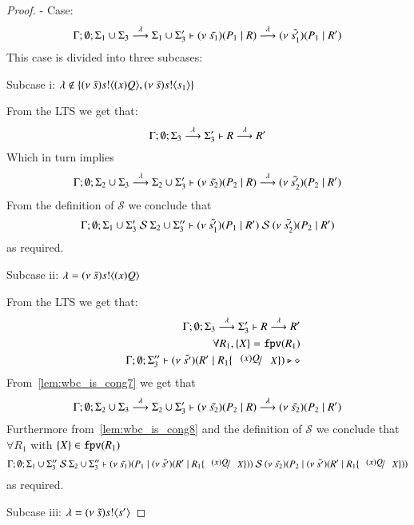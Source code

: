 \begin{proof}
	\noi - Case:
%
	\[
		\Gamma; \emptyset; \Sigma_1 \cup \Sigma_3 \stackrel{\lambda}{\longrightarrow} \Sigma_1 \cup \Sigma_3' \vdash (\nu\ \tilde{s_1})(P_1 \;|\; R) \stackrel{\lambda}{\longrightarrow} (\nu\ \tilde{s_1'})(P_1 \;|\; R')
	\]
%
	\noi This case is divided into three subcases:

	\noi Subcase i: $\lambda \notin \{(\nu\ \tilde{s}) s ! \langle (x)Q \rangle, (\nu\ \tilde{s}) s ! \langle s_1 \rangle\}$

	\noi From the LTS we get that:
	\[
		\Gamma; \emptyset; \Sigma_3 \stackrel{\lambda}{\longrightarrow} \Sigma_3' \vdash R \stackrel{\lambda}{\longrightarrow} R'
	\]
%
	\noi Which in turn implies
	\begin{eqnarray*}
		\Gamma; \emptyset; \Sigma_2 \cup \Sigma_3 \stackrel{\lambda}{\longrightarrow} \Sigma_2 \cup \Sigma_3' \vdash (\nu\ \tilde{s_2})(P_2 \;|\; R) \stackrel{\lambda}{\longrightarrow} (\nu\ \tilde{s_2'})(P_2 \;|\; R')
	\end{eqnarray*}
%
	\noi From the definition of $\mathcal{S}$ we conclude that
	\[
		\Gamma; \emptyset; \Sigma_1 \cup \Sigma_3'\ \mathcal{S}\ \Sigma_2 \cup \Sigma_3'' \vdash (\nu\ \tilde{s_1'})(P_1 \;|\; R')\ \mathcal{S}\ (\nu\ \tilde{s_2'})(P_2 \;|\; R')
	\]
	\noi as required.

	\noi Subcase ii: $\lambda = (\nu\ \tilde{s}) s ! \langle (x)Q \rangle$

	\noi From the LTS we get that:
	\begin{eqnarray}
		& &	\Gamma; \emptyset; \Sigma_3 \by{\lambda} \Sigma_3' \proves R \by{\lambda} R' \label{lem:wbc_is_cong7}\\
		& & 	\forall R_1, \set{X} = \fpv{R_1}\\
		& &	\Gamma; \emptyset; \Sigma_3'' \proves \newsp{\tilde{s'}}{R' \Par R_1 \subst{(x) Q}{X}} \hastype \Proc \label{lem:wbc_is_cong8}
	\end{eqnarray}
%
	\noi From~\ref{lem:wbc_is_cong7} we get that
	\[
		\Gamma; \emptyset; \Sigma_2 \cup \Sigma_3 \stackrel{\lambda}{\longrightarrow} \Sigma_2 \cup \Sigma_3' \vdash (\nu\ \tilde{s_2})(P_2 \;|\; R) \stackrel{\lambda}{\longrightarrow} (\nu\ \tilde{s_2})(P_2 \;|\; R')
	\]
	\noi Furthermore from~\ref{lem:wbc_is_cong8} and the definition of $\mathcal{S}$ we conclude that
	$\forall R_1$ with $\{X\} \in \mathtt{fpv}(R_1)$
	\[
		\Gamma; \emptyset; \Sigma_1 \cup \Sigma_3''\ \mathcal{S}\ \Sigma_2 \cup \Sigma_3'' \proves \newsp{\tilde{s_1}}{P_1 \Par \newsp{\tilde{s'}}{R' \Par R_1 \subst{(x) Q}{X}}}\ \mathcal{S}\ \newsp{\tilde{s_2}}{P_2 \Par \newsp{\tilde{s'}}{R' \Par R_1 \subst{(x) Q}{X}}}
	\]
	\noi as required.

	\noi Subcase iii: $\lambda = (\nu\ \tilde{s}) s ! \langle s' \rangle$


\end{proof}
